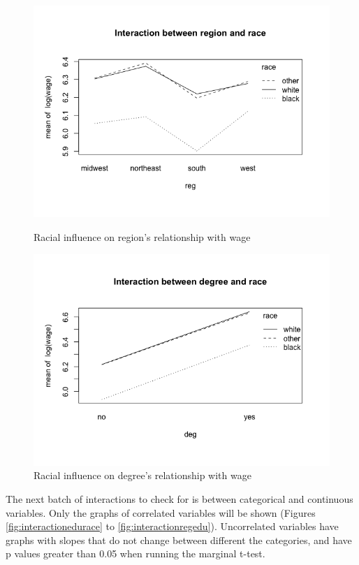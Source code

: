 \documentclass{article}
\begin{document}
\begin{figure}
\begin{minipage}{.45\textwidth}
          \includegraphics[scale=0.35]{interaction/regionrace}
          \caption{Racial influence on region's relationship with wage}
          \label{fig:interactionregionrace}

          \includegraphics[scale=0.35]{interaction/degreerace}
          \caption{Racial influence on degree's relationship with wage}
          \label{fig:interactiondegreerace}
        \end{minipage}
      \end{figure}

      The next batch of interactions to check for is between categorical and
      continuous variables. Only the graphs of correlated variables will
      be shown (Figures \ref{fig:interactionedurace} to \ref{fig:interactionregedu}).
      Uncorrelated variables have graphs with slopes that do not change between
      different the categories, and have p values greater than 0.05 when running
      the marginal t-test.
\end{document}
